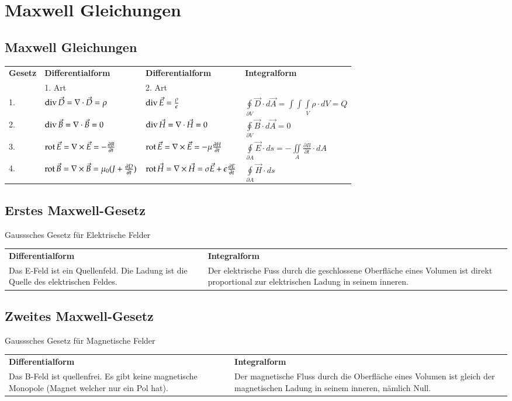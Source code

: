 \section{Maxwell Gleichungen}
\subsection{Maxwell Gleichungen}
\begin{longtable}{|p{}|p{} |p{}|p{}| }
	\hline
	\textbf{Gesetz}&\textbf{Differentialform} &\textbf{Differentialform} &\textbf{Integralform}\\
	&1. Art & 2. Art &\\
	\hline
	1.&$\operatorname{div} \vec{D}=\nabla \cdot \vec{D}= \rho$ & $\operatorname{div} \vec{E}= \frac{\rho}{\epsilon}$&$\oint\limits_{\partial V}\vec{D}\cdot d\vec{A}=\int\int\int\limits_{V}\rho \cdot dV=Q$\\
	\hline
	2.&$\operatorname{div} \vec{B}=\nabla \cdot \vec{B}=0$&$\operatorname{div} \vec{H}=\nabla \cdot \vec{H}=0 $&$\oint\limits_{\partial V}\vec{B}\cdot d\vec{A}=0$\\
	\hline
	3.&$\operatorname{rot} \vec{E}=\nabla \times \vec{E}=-\frac{\partial B}{\partial t}$&$\operatorname{rot} \vec{E}=\nabla \times \vec{E}=-\mu \frac{\partial H}{\partial t}$&$\oint\limits_{\partial A}\vec{E}\cdot ds=-\iint\limits_{A}\frac{\partial B}{\partial t}\cdot dA$\\
	\hline
	4.&$\operatorname{rot}\vec{B}=\nabla\times\vec{B}=\mu_0 (J+\frac{\partial D}{\partial t})$&$\operatorname{rot} \vec{H}=\nabla \times \vec{H}=\sigma\vec{E}+\epsilon \frac{\partial E}{\partial t}$&$\oint\limits_{\partial A} \vec{H}\cdot ds$\\
	\hline
\end{longtable}
\subsection{Erstes Maxwell-Gesetz}
Gausssches Gesetz für Elektrische Felder\\
\begin{tabular}{p{} p{}}
	\textbf{Differentialform}&\textbf{Integralform}\\
	Das E-Feld ist ein Quellenfeld. Die Ladung ist die Quelle des elektrischen Feldes. & Der elektrische Fuss durch die geschlossene Oberfläche eines Volumen ist direkt proportional zur elektrischen Ladung in seinem inneren. \\
\end{tabular}
\subsection{Zweites Maxwell-Gesetz}
Gausssches Gesetz für Magnetische Felder\\
\begin{tabular}{p{} p{}}
	\textbf{Differentialform}&\textbf{Integralform}\\
	Das B-Feld ist quellenfrei. Es gibt keine magnetische Monopole (Magnet welcher nur ein Pol hat).& Der magnetische Fluss durch die Oberfläche eines Volumen ist gleich der magnetischen Ladung in seinem inneren, nämlich Null.\\
\end{tabular}
